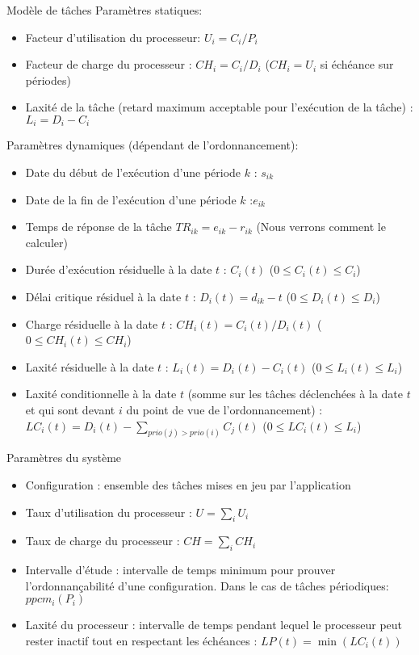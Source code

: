 \begin{frame}{Modèle de tâches}
  Paramètres statiques:
  \begin{itemize} 
  \item Facteur d'utilisation du processeur: $U_i =  C_i /P_i$
  \item Facteur de charge du processeur : $CH_i = C_i / D_i $ ($CH_i =
    U_i$ si échéance sur périodes)
  \item Laxité de la tâche (retard maximum acceptable pour l'exécution
    de la tâche) : $L_i = D_i - C_i$
  \end{itemize} 
  Paramètres dynamiques (dépendant de l'ordonnancement):
  \begin{itemize} 
  \item Date du début de l'exécution d'une période $k$ : $s_{ik}$
  \item Date de la fin de l'exécution d'une période $k$ :$e_{ik}$
  \item Temps de réponse de la tâche $TR_{ik} = e_{ik} - r_{ik}$ (Nous
    verrons comment le calculer)
  \item Durée d'exécution résiduelle à la date $t$ : $C_i(t)$ ($0 \leq
    C_i(t) \leq C_i$)
  \item Délai  critique résiduel à la  date $t$ :  $D_i(t) = d_{ik}-t$
    ($0 \leq D_i(t) \leq D_i$)
  \item Charge résiduelle à la date $t$ :
    $CH_i(t) = C_i(t) / D_i(t)$  ($0 \leq CH_i(t) \leq CH_i$)
  \item Laxité  résiduelle à la  date $t$ :
    $L_i(t) = D_i(t) - C_i(t)$  ($0  \leq L_i(t) \leq  L_i$)
  \item  Laxité conditionnelle  à la  date $t$  (somme sur  les tâches
    déclenchées à la  date $t$ et qui sont devant $i$  du point de vue
    de  l'ordonnancement)  :  $LC_i(t)  =  D_i(t)  -  \sum_{prio(j)  >
      prio(i)} C_j(t)$ ($0 \leq LC_i(t) \leq L_i$)
  \end{itemize} 
\end{frame}


\begin{frame}{Paramètres du système}
  \begin{itemize} 
  \item  Configuration  :  ensemble   des  tâches  mises  en  jeu  par
    l'application
  \item Taux d'utilisation du processeur : $U = \sum_i U_i$
  \item Taux de charge du processeur : $CH = \sum_i CH_i$
  \item Intervalle d'étude :  intervalle de temps minimum pour prouver
    l'ordonnançabilité  d'une  configuration. Dans  le  cas de  tâches
    périodiques: $ppcm_i(P_i)$
  \item Laxité du  processeur : intervalle de temps  pendant lequel le
    processeur peut rester inactif  tout en respectant les échéances :
    $ LP(t) = \min(LC_i(t))$
  \end{itemize} 
\end{frame} 

